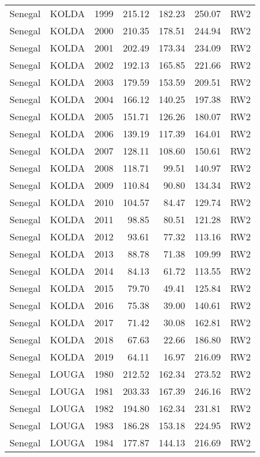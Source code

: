 \begin{longtable}{lllrrrl}
  Senegal & KOLDA & 1999 & 215.12 & 182.23 & 250.07 & RW2 \\ 
  Senegal & KOLDA & 2000 & 210.35 & 178.51 & 244.94 & RW2 \\ 
  Senegal & KOLDA & 2001 & 202.49 & 173.34 & 234.09 & RW2 \\ 
  Senegal & KOLDA & 2002 & 192.13 & 165.85 & 221.66 & RW2 \\ 
  Senegal & KOLDA & 2003 & 179.59 & 153.59 & 209.51 & RW2 \\ 
  Senegal & KOLDA & 2004 & 166.12 & 140.25 & 197.38 & RW2 \\ 
  Senegal & KOLDA & 2005 & 151.71 & 126.26 & 180.07 & RW2 \\ 
  Senegal & KOLDA & 2006 & 139.19 & 117.39 & 164.01 & RW2 \\ 
  Senegal & KOLDA & 2007 & 128.11 & 108.60 & 150.61 & RW2 \\ 
  Senegal & KOLDA & 2008 & 118.71 & 99.51 & 140.97 & RW2 \\ 
  Senegal & KOLDA & 2009 & 110.84 & 90.80 & 134.34 & RW2 \\ 
  Senegal & KOLDA & 2010 & 104.57 & 84.47 & 129.74 & RW2 \\ 
  Senegal & KOLDA & 2011 & 98.85 & 80.51 & 121.28 & RW2 \\ 
  Senegal & KOLDA & 2012 & 93.61 & 77.32 & 113.16 & RW2 \\ 
  Senegal & KOLDA & 2013 & 88.78 & 71.38 & 109.99 & RW2 \\ 
  Senegal & KOLDA & 2014 & 84.13 & 61.72 & 113.55 & RW2 \\ 
  Senegal & KOLDA & 2015 & 79.70 & 49.41 & 125.84 & RW2 \\ 
  Senegal & KOLDA & 2016 & 75.38 & 39.00 & 140.61 & RW2 \\ 
  Senegal & KOLDA & 2017 & 71.42 & 30.08 & 162.81 & RW2 \\ 
  Senegal & KOLDA & 2018 & 67.63 & 22.66 & 186.80 & RW2 \\ 
  Senegal & KOLDA & 2019 & 64.11 & 16.97 & 216.09 & RW2 \\ 
  Senegal & LOUGA & 1980 & 212.52 & 162.34 & 273.52 & RW2 \\ 
  Senegal & LOUGA & 1981 & 203.33 & 167.39 & 246.16 & RW2 \\ 
  Senegal & LOUGA & 1982 & 194.80 & 162.34 & 231.81 & RW2 \\ 
  Senegal & LOUGA & 1983 & 186.28 & 153.18 & 224.95 & RW2 \\ 
  Senegal & LOUGA & 1984 & 177.87 & 144.13 & 216.69 & RW2 \\ 

\end{longtable}
